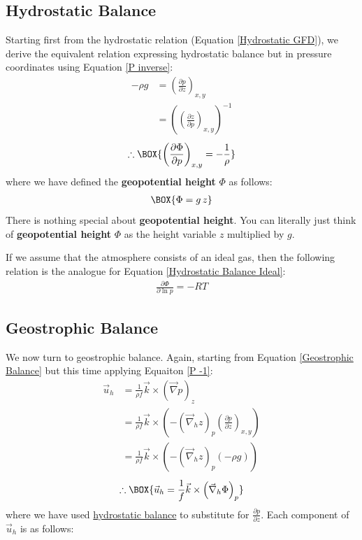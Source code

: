 \subsection{Hydrostatic Balance}

Starting first from the hydrostatic relation (Equation \ref{Hydrostatic GFD}), we derive the equivalent relation expressing hydrostatic balance but in pressure coordinates using Equation \ref{P inverse}:
\begin{align*}
    -\rho g &= \left( \frac{\partial p}{\partial z} \right)_{x,y}
    \\
    &=\left( \left( \frac{\partial z}{\partial p} \right)_{x,y} \right)^{-1}
\end{align*}
\begin{align}
    \label{Hydrostatic Pressure}
    \therefore \BOX{
        \left( \frac{\partial \Phi}{\partial p} \right)_{x,y}
        =-\frac{1}{\rho}
    }
\end{align}
where we have defined the \textbf{geopotential height} \(\Phi\) as follows:
\begin{align}
    \label{eq Geopotential}
    \BOX{\Phi =g\,z}
\end{align}
There is nothing special about \textbf{geopotential height}. You can literally just think of \textbf{geopotential height} \(\Phi\) as the height variable \(z\) multiplied by \(g\). 

If we assume that the atmosphere consists of an ideal gas, then the following relation is the analogue for Equation \ref{Hydrostatic Balance Ideal}:
\begin{align}
    \boxed{\frac{\partial \Phi}{\partial \ln p}=-RT}
    \label{Hydrostatic Pressure Ideal}
\end{align}

\subsection{Geostrophic Balance}

We now turn to geostrophic balance. Again, starting from Equation \ref{Geostrophic Balance} but this time applying Equaiton \ref{P -1}:
\begin{align*}
    \vec{u}_h &= \frac{1}{\rho f}\vec{k}\times\left(\vec{\nabla}p\right)_z
    \\
    &=\frac{1}{\rho f}\vec{k}\times\left( 
        -\left( \vec{\nabla}_h z \right)_p \left( \frac{\partial p}{\partial z} \right)_{x,y}
     \right)
    \\
    &=\frac{1}{\rho f}\vec{k}\times\left( 
        -\left( \vec{\nabla}_h z \right)_p (-\rho g)
    \right)
\end{align*}
\begin{align}
    \label{Geostrophic Pressure}
    \therefore \BOX{
        \vec{u}_h = \frac{1}{f}\vec{k}\times\left( \vec{\nabla}_h \Phi \right)_p
    }
\end{align}
where we have used \hyperref[Hydrostatic GFD Box]{hydrostatic balance} to substitute for \(\frac{\partial p}{\partial z}\). Each component of \(\vec{u}_h\) is as follows:

